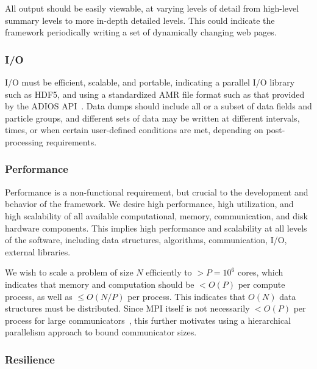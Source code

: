 \documentclass[10pt,twocolumn]{article}
\begin{document}
All output should be easily viewable, at varying levels of detail from
high-level summary levels to more in-depth detailed levels.  This
could indicate the framework periodically writing a set of dynamically
changing web pages.


\subsubsection{I/O } \label{sss:require-io}

I/O must be efficient, scalable, and portable, indicating a parallel
I/O library such as HDF5, and using a standardized AMR file format
such as that provided by the ADIOS API~\cite{LoKl08}.  Data dumps
should include all or a subset of data fields and particle groups, and
different sets of data may be written at different intervals, times,
or when certain user-defined conditions are met, depending on
post-processing requirements.

\subsubsection{Performance}  \label{sss:require-performance}

Performance is a non-functional requirement, but crucial to the
development and behavior of the framework.  We desire high
performance, high utilization, and high scalability of all available
computational, memory, communication, and disk hardware components.
This implies high performance and scalability at all levels of the
software, including data structures, algorithms, communication, I/O,
external libraries.

We wish to scale a problem of size $N$ efficiently to $> P = 10^6$
cores, which indicates that memory and computation should be $< O(P)$
per compute process, as well as $\leq O(N/P)$ per process.  This
indicates that $O(N)$ data structures must be distributed.  Since MPI
itself is not necessarily $< O(P)$ per process for large
communicators~\cite{BaBu09}, this further motivates using a
hierarchical parallelism approach to bound communicator sizes.

\subsubsection{Resilience} \label{sss:require-resilience}
\end{document}
